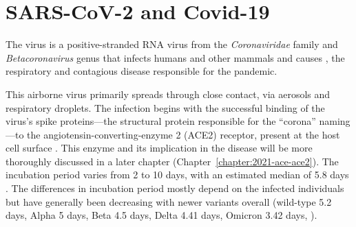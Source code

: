 

\clearpage
\section{SARS-CoV-2 and Covid-19}
\label{sec:sars-and-covid}

The \sars virus is a positive-stranded RNA virus from the \textit{Coronaviridae} family and \textit{Betacoronavirus} genus that infects humans and other mammals and causes \covid, the respiratory and contagious disease responsible for the \covid pandemic.

This airborne virus primarily spreads through close contact, via aerosols and respiratory droplets.
The infection begins with the successful binding of the virus's spike proteins---the structural protein responsible for the ``corona'' naming---to the angiotensin-converting-enzyme 2 (ACE2) receptor, present at the host cell surface \citep{ge2013IsolationCharacterization, hoffmann2020SARSCoV2Cell}.
This enzyme and its implication in the disease will be more thoroughly discussed in a later chapter (Chapter~\ref{chapter:2021-ace-ace2}).
The incubation period varies from 2 to 10 days, with an estimated median of 5.8 days 
\citep{wei2022ComprehensiveEstimation}.
The differences in incubation period mostly depend on the infected individuals but have generally been decreasing with newer variants overall (wild-type 5.2 days, Alpha 5 days, Beta 4.5 days, Delta 4.41 days, Omicron 3.42 days, \citealt{wu2022IncubationPeriod}).

